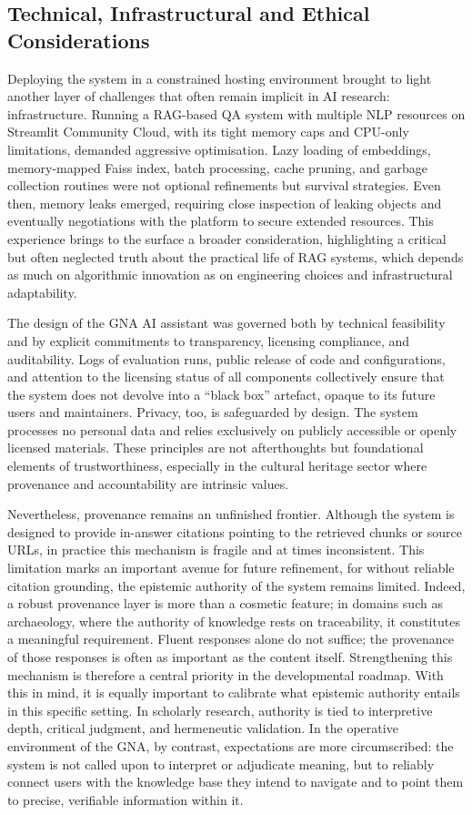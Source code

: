 \begin{spacing}{1.5}
\section{Technical, Infrastructural and Ethical Considerations}
Deploying the system in a constrained hosting environment brought to light another layer of challenges that often remain implicit in AI research: infrastructure. Running a RAG-based QA system with multiple NLP resources on Streamlit Community Cloud, with its tight memory caps and CPU-only limitations, demanded aggressive optimisation. Lazy loading of embeddings, memory-mapped Faiss index, batch processing, cache pruning, and garbage collection routines were not optional refinements but survival strategies. Even then, memory leaks emerged, requiring close inspection of leaking objects and eventually negotiations with the platform to secure extended resources. This experience brings to the surface a broader consideration, highlighting a critical but often neglected truth about the practical life of RAG systems, which depends as much on algorithmic innovation as on engineering choices and infrastructural adaptability.

The design of the GNA AI assistant was governed both by technical feasibility and by explicit commitments to transparency, licensing compliance, and auditability. Logs of evaluation runs, public release of code and configurations, and attention to the licensing status of all components collectively ensure that the system does not devolve into a ``black box'' artefact, opaque to its future users and maintainers. Privacy, too, is safeguarded by design. The system processes no personal data and relies exclusively on publicly accessible or openly licensed materials. These principles are not afterthoughts but foundational elements of trustworthiness, especially in the cultural heritage sector where provenance and accountability are intrinsic values.

Nevertheless, provenance remains an unfinished frontier. Although the system is designed to provide in-answer citations pointing to the retrieved chunks or source URLs, in practice this mechanism is fragile and at times inconsistent. This limitation marks an important avenue for future refinement, for without reliable citation grounding, the epistemic authority of the system remains limited. Indeed, a robust provenance layer is more than a cosmetic feature; in domains such as archaeology, where the authority of knowledge rests on traceability, it constitutes a meaningful requirement. Fluent responses alone do not suffice; the provenance of those responses is often as important as the content itself. Strengthening this mechanism is therefore a central priority in the developmental roadmap. With this in mind, it is equally important to calibrate what epistemic authority entails in this specific setting. In scholarly research, authority is tied to interpretive depth, critical judgment, and hermeneutic validation. In the operative environment of the GNA, by contrast, expectations are more circumscribed: the system is not called upon to interpret or adjudicate meaning, but to reliably connect users with the knowledge base they intend to navigate and to point them to precise, verifiable information within it.


\end{spacing}

